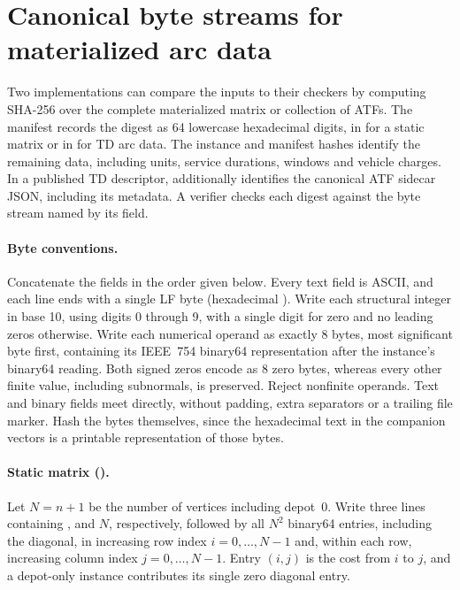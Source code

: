 \section{Canonical byte streams for materialized arc data}\label{app:materialization-format}

Two implementations can compare the inputs to their checkers by computing SHA-256 over the complete materialized matrix or collection of ATFs. The manifest records the digest as 64 lowercase hexadecimal digits, in  for a static matrix or in  for TD arc data. The instance and manifest hashes identify the remaining data, including units, service durations, windows and vehicle charges. In a published TD descriptor,  additionally identifies the canonical ATF sidecar JSON, including its metadata. A verifier checks each digest against the byte stream named by its field.

\paragraph{Byte conventions.}
Concatenate the fields in the order given below. Every text field is ASCII, and each line ends with a single LF byte (hexadecimal ). Write each structural integer in base 10, using digits 0 through 9, with a single digit for zero and no leading zeros otherwise. Write each numerical operand as exactly 8 bytes, most significant byte first, containing its IEEE~754 binary64 representation after the instance's binary64 reading. Both signed zeros encode as 8 zero bytes, whereas every other finite value, including subnormals, is preserved. Reject nonfinite operands. Text and binary fields meet directly, without padding, extra separators or a trailing file marker. Hash the bytes themselves, since the hexadecimal text in the companion vectors is a printable representation of those bytes.

\paragraph{Static matrix ().}
Let $N=n+1$ be the number of vertices including depot~0. Write three lines containing ,  and $N$, respectively, followed by all $N^2$ binary64 entries, including the diagonal, in increasing row index $i=0,\ldots,N-1$ and, within each row, increasing column index $j=0,\ldots,N-1$. Entry $(i,j)$ is the cost from $i$ to $j$, and a depot-only instance contributes its single zero diagonal entry.

